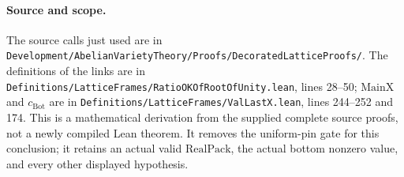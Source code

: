 \paragraph{Source and scope.}
The source calls just used are in
\texttt{Development/AbelianVarietyTheory/Proofs/DecoratedLatticeProofs/}.
The definitions of the links are in
\texttt{Definitions/LatticeFrames/RatioOKOfRootOfUnity.lean},
lines 28--50; $\mathrm{MainX}$ and $c_{\mathrm{Bot}}$ are in
\texttt{Definitions/LatticeFrames/ValLastX.lean}, lines 244--252
and 174.  This is a mathematical derivation from the supplied complete
source proofs, not a newly compiled Lean theorem.  It removes the
uniform-pin gate for this conclusion; it retains an actual valid
$\mathrm{RealPack}$, the actual bottom nonzero value, and every
other displayed hypothesis.
